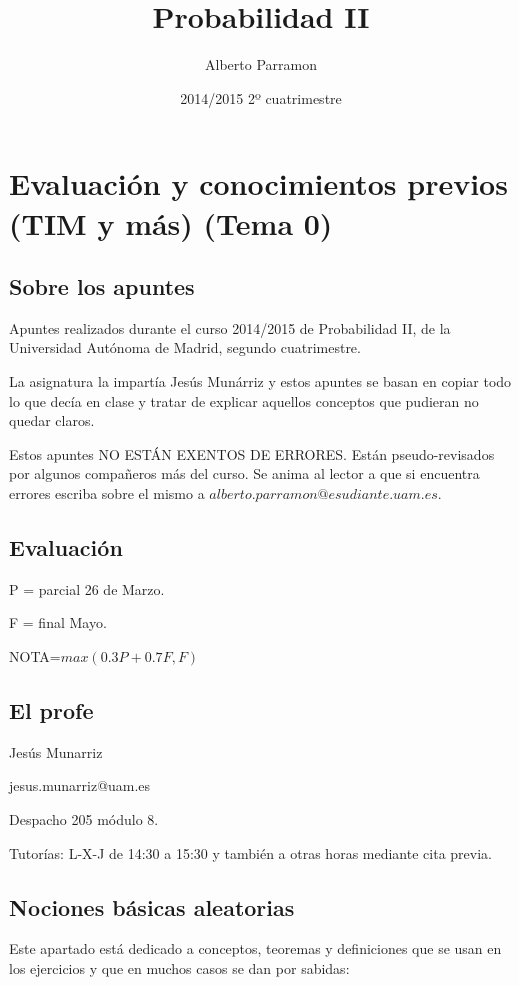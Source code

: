 \documentclass{apuntes}
\author{Alberto Parramon}
\date{2014/2015 2º cuatrimestre}
\title{Probabilidad II}
\begin{document}
\pagestyle{plain}
\maketitle

\tableofcontents
\newpage
\chapter{Evaluación y conocimientos previos (TIM y más) (Tema 0)}


\section{Sobre los apuntes}
Apuntes realizados durante el curso 2014/2015 de Probabilidad II, de la Universidad Autónoma de Madrid, segundo cuatrimestre. 

La asignatura la impartía Jesús Munárriz y estos apuntes se basan en copiar todo lo que decía en clase y tratar de explicar aquellos conceptos que pudieran no quedar claros.

Estos apuntes NO ESTÁN EXENTOS DE ERRORES. Están pseudo-revisados por algunos compañeros más del curso. Se anima al lector a que si encuentra errores escriba sobre el mismo a $alberto.parramon@esudiante.uam.es$.


\section{Evaluación}
P = parcial 26 de Marzo.

F = final Mayo.

NOTA=$max(0.3P+0.7F,F)$ 

\section{El profe}
Jesús Munarriz

jesus.munarriz@uam.es

Despacho 205 módulo 8.

Tutorías: L-X-J de 14:30 a 15:30 y también a otras horas mediante cita previa.

\section{Nociones básicas aleatorias}
Este apartado está dedicado a conceptos, teoremas y definiciones que se usan en los ejercicios y que en muchos casos se dan por sabidas:
\end{document}
